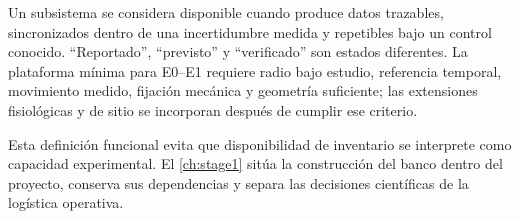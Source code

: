 Un subsistema se considera disponible cuando produce datos trazables, sincronizados dentro de una incertidumbre medida y repetibles bajo un control conocido. ``Reportado'', ``previsto'' y ``verificado'' son estados diferentes. La plataforma mínima para E0--E1 requiere radio bajo estudio, referencia temporal, movimiento medido, fijación mecánica y geometría suficiente; las extensiones fisiológicas y de sitio se incorporan después de cumplir ese criterio.

Esta definición funcional evita que disponibilidad de inventario se interprete como
capacidad experimental. El \cref{ch:stage1} sitúa la construcción del banco dentro
del proyecto, conserva sus dependencias y separa las decisiones científicas de la
logística operativa.
